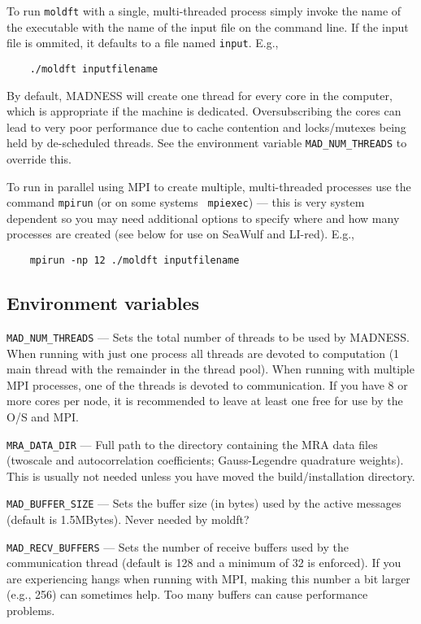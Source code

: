 \documentclass[letterpaper]{book}
\begin{document}
To run {\tt moldft} with a single, multi-threaded process simply
invoke the name of the executable with the name of the input file on
the command line.  If the input file is ommited, it defaults to a file
named {\tt input}.  E.g.,

\begin{verbatim}
    ./moldft inputfilename
\end{verbatim}

By default, MADNESS will create one thread for every core in the
computer, which is appropriate if the machine is dedicated.
Oversubscribing the cores can lead to very poor performance due to
cache contention and locks/mutexes being held by de-scheduled threads.
See the environment variable \verb+MAD_NUM_THREADS+ to override this.

To run in parallel using MPI to create multiple, multi-threaded
processes use the command {\tt mpirun} (or on some systems {\tt
  mpiexec}) --- this is very system dependent so you may need
additional options to specify where and how many processes are created
(see below for use on SeaWulf and LI-red).  E.g.,

\begin{verbatim}
    mpirun -np 12 ./moldft inputfilename
\end{verbatim}

\subsection{Environment variables}

\verb+MAD_NUM_THREADS+ --- Sets the total number of threads to be used
by MADNESS.  When running with just one process all threads are
devoted to computation (1 main thread with the remainder in the thread
pool).  When running with multiple MPI processes, one of the threads
is devoted to communication.  If you have 8 or more cores per node, it
is recommended to leave at least one free for use by the O/S and MPI.

\verb+MRA_DATA_DIR+ --- Full path to the directory containing the MRA
data files (twoscale and autocorrelation coefficients; Gauss-Legendre
quadrature weights).  This is usually not needed unless you have moved
the build/installation directory.

\verb+MAD_BUFFER_SIZE+ --- Sets the buffer size (in bytes) used by the
active messages (default is 1.5MBytes).  Never needed by moldft?

\verb+MAD_RECV_BUFFERS+ --- Sets the number of receive buffers used by
the communication thread (default is 128 and a minimum of 32 is
enforced).  If you are experiencing hangs when running with MPI,
making this number a bit larger (e.g., 256) can sometimes help. Too
many buffers can cause performance problems.
\end{document}
